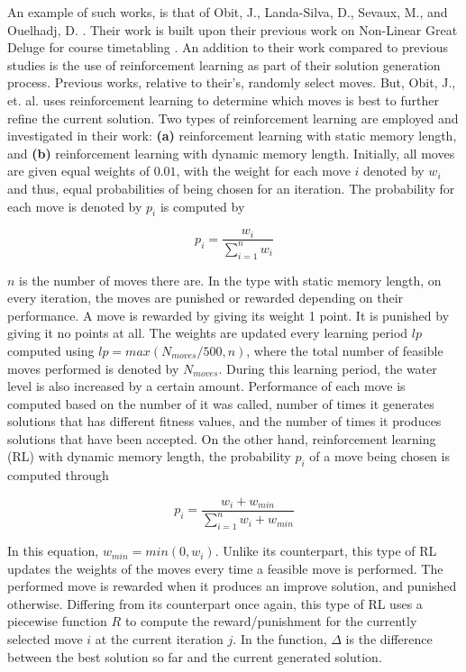 An example of such works, is that of Obit, J., Landa-Silva, D., Sevaux, M., and Ouelhadj, D. \cite{nlgdrl-obit}. Their work is built upon their previous work on Non-Linear Great Deluge for course timetabling \cite{nlgd-landa-silva}. An addition to their work compared to previous studies is the use of reinforcement learning as part of their solution generation process. Previous works, relative to their's, randomly select moves. But, Obit, J., et. al. uses reinforcement learning to determine which moves is best to further refine the current solution. Two types of reinforcement learning are employed and investigated in their work: \textbf{(a)} reinforcement learning with static memory length, and \textbf{(b)} reinforcement learning with dynamic memory length. Initially, all moves are given equal weights of $0.01$, with the weight for each move $i$ denoted by $w_{i}$ and thus, equal probabilities of being chosen for an iteration. The probability for each move is denoted by $p_{i}$ is computed by

\[
	p_{i} = \frac{w_{i}}{\sum_{i=1}^{n}w_{i}}
\]

$n$ is the number of moves there are. In the type with static memory length, on every iteration, the moves are punished or rewarded depending on their performance. A move is rewarded by giving its weight 1 point. It is punished by giving it no points at all. The weights are updated every learning period $lp$ computed using $lp = max(N_{moves}/500, n)$, where the total number of feasible moves performed is denoted by $N_{moves}$. During this learning period, the water level is also increased by a certain amount. Performance of each move is computed based on the number of it was called, number of times it generates solutions that has different fitness values, and the number of times it produces solutions that have been accepted. On the other hand, reinforcement learning (RL) with dynamic memory length, the probability $p_{i}$ of a move being chosen is computed through

\[
	p_{i} = \frac{w_{i} + w_{min}}{\sum_{i=1}^{n}{w_{i} + w_{min}}}
\]

In this equation, $w_{min} = min(0, w_{i})$. Unlike its counterpart, this type of RL updates the weights of the moves every time a feasible move is performed. The performed move is rewarded when it produces an improve solution, and punished otherwise. Differing from its counterpart once again, this type of RL uses a piecewise function $R$ to compute the reward/punishment for the currently selected move $i$ at the current iteration $j$. In the function, $\Delta$ is the difference between the best solution so far and the current generated solution.

